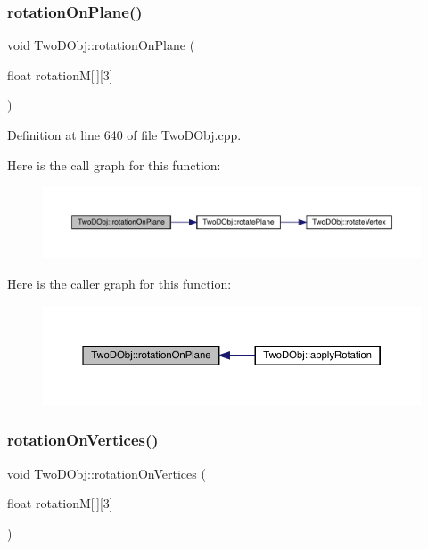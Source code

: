 \subsubsection{\texorpdfstring{rotation\+On\+Plane()}{rotationOnPlane()}}
{\footnotesize\ttfamily void Two\+D\+Obj\+::rotation\+On\+Plane (\begin{DoxyParamCaption}\item[{float}]{rotationM\mbox{[}$\,$\mbox{]}\mbox{[}3\mbox{]} }\end{DoxyParamCaption})}



Definition at line 640 of file Two\+D\+Obj.\+cpp.

Here is the call graph for this function\+:
\nopagebreak
\begin{figure}[H]
\begin{center}
\leavevmode
\includegraphics[width=350pt]{class_two_d_obj_a2627a8f625c1076f4261dd61724be835_cgraph}
\end{center}
\end{figure}
Here is the caller graph for this function\+:
\nopagebreak
\begin{figure}[H]
\begin{center}
\leavevmode
\includegraphics[width=350pt]{class_two_d_obj_a2627a8f625c1076f4261dd61724be835_icgraph}
\end{center}
\end{figure}
\mbox{\label{class_two_d_obj_a68343b4431fd7282dde6fabbf7a231ce}} 
\subsubsection{\texorpdfstring{rotation\+On\+Vertices()}{rotationOnVertices()}}
{\footnotesize\ttfamily void Two\+D\+Obj\+::rotation\+On\+Vertices (\begin{DoxyParamCaption}\item[{float}]{rotationM\mbox{[}$\,$\mbox{]}\mbox{[}3\mbox{]} }\end{DoxyParamCaption})}



